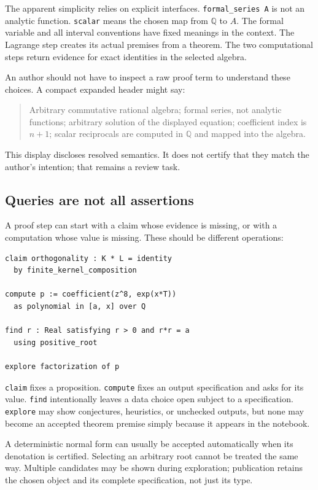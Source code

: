 \documentclass[11pt,a4paper]{article}
\newcommand{\code}[1]{\nolinkurl{#1}}
\newcommand{\Q}{\mathbb Q}
\theoremstyle{definition}
\begin{document}
The apparent simplicity relies on explicit interfaces. \code{formal_series A} is not an analytic function. \code{scalar} means the chosen map from \(\Q\) to \(A\). The formal variable and all interval conventions have fixed meanings in the context. The Lagrange step creates its actual premises from a theorem. The two computational steps return evidence for exact identities in the selected algebra.

An author should not have to inspect a raw proof term to understand these choices. A compact expanded header might say:
\begin{quote}
Arbitrary commutative rational algebra; formal series, not analytic functions; arbitrary solution of the displayed equation; coefficient index is \(n+1\); scalar reciprocals are computed in \(\Q\) and mapped into the algebra.
\end{quote}
This display discloses resolved semantics. It does not certify that they match the author's intention; that remains a review task.

\subsection{Queries are not all assertions}
A proof step can start with a claim whose evidence is missing, or with a computation whose value is missing. These should be different operations:
\par\noindent\begin{minipage}{\linewidth}
\begin{lstlisting}
claim orthogonality : K * L = identity
  by finite_kernel_composition

compute p := coefficient(z^8, exp(x*T))
  as polynomial in [a, x] over Q

find r : Real satisfying r > 0 and r*r = a
  using positive_root

explore factorization of p
\end{lstlisting}
\end{minipage}\par

\code{claim} fixes a proposition. \code{compute} fixes an output specification and asks for its value. \code{find} intentionally leaves a data choice open subject to a specification. \code{explore} may show conjectures, heuristics, or unchecked outputs, but none may become an accepted theorem premise simply because it appears in the notebook.

A deterministic normal form can usually be accepted automatically when its denotation is certified. Selecting an arbitrary root cannot be treated the same way. Multiple candidates may be shown during exploration; publication retains the chosen object and its complete specification, not just its type.
\end{document}
